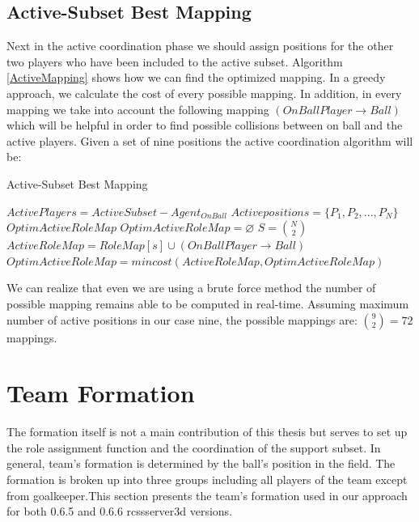 \subsection{Active-Subset Best Mapping}
Next in the active coordination phase we should assign positions for the other two players who have been included to the active subset. Algorithm \ref{ActiveMapping} shows how we can find the optimized mapping. In a greedy approach, we calculate the cost of every possible mapping. In addition, in every mapping we take into account the following mapping $(OnBallPlayer \rightarrow Ball)$ which will be helpful in order to find possible collisions between on ball and the active players. Given a set of nine positions the active coordination algorithm will be:
\begin{algorithm}[htb!]
\caption{Active-Subset Best Mapping}
\label{ActiveMapping}
\begin{algorithmic}[1]
$ActivePlayers = ActiveSubset - Agent_{OnBall} $
\STATE $Activepositions = \lbrace P_{1},P_{2},...,P_{N} \rbrace $
$OptimActiveRoleMap$
\STATE $OptimActiveRoleMap = \varnothing $
\STATE $S = {{N}\choose{2}}$
\STATE $ActiveRoleMap = RoleMap[s] \cup (OnBallPlayer \rightarrow Ball)$
\STATE $OptimActiveRoleMap = mincost(ActiveRoleMap,OptimActiveRoleMap)$
\ENDFOR
\end{algorithmic}
\end{algorithm}
We can realize that even we are using a brute force method the number of possible mapping remains able to be computed in real-time. Assuming maximum number of active positions in our case nine, the possible mappings are: ${{9}\choose{2}} = 72$ mappings.

\section{Team Formation}
The formation itself is not a main contribution of this thesis but serves to set up the role assignment function and the coordination of the support subset. In general, team's formation is determined by the ball's position in the field. The formation is broken up into three groups including all players of the team except from goalkeeper.This section presents the team's formation used in our approach for both 0.6.5 and 0.6.6 rcssserver3d versions.
